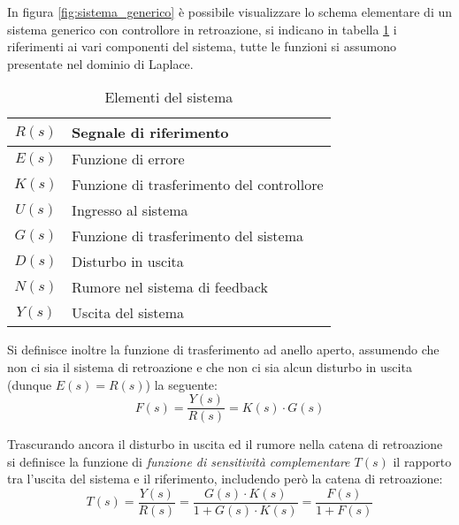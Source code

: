 In figura \ref{fig:sistema_generico} è possibile visualizzare lo schema elementare di un sistema generico con controllore in retroazione, si indicano in tabella \ref{tab:elementi_sistema} i riferimenti ai vari componenti del sistema, tutte le funzioni si assumono presentate nel dominio di Laplace.
\begin{table}[h]\centering
    \begin{tabular}{c | l}
        $R(s)$ & Segnale di riferimento                    \\ \hline
        $E(s)$ & Funzione di errore                        \\ \hline
        $K(s)$ & Funzione di trasferimento del controllore \\ \hline
        $U(s)$ & Ingresso al sistema                       \\ \hline
        $G(s)$ & Funzione di trasferimento del sistema     \\ \hline
        $D(s)$ & Disturbo in uscita                        \\ \hline
        $N(s)$ & Rumore nel sistema di feedback            \\ \hline
        $Y(s)$ & Uscita del sistema
    \end{tabular}
    \caption{Elementi del sistema}
    \label{tab:elementi_sistema}
\end{table}

Si definisce inoltre la funzione di trasferimento ad anello aperto, assumendo che non ci sia il sistema di retroazione e che non ci sia alcun disturbo in uscita (dunque $E(s) = R(s)$) la seguente:
$$
    F(s) = \frac{Y(s)}{R(s)} = K(s)\cdot G(s)
$$

Trascurando ancora il disturbo in uscita ed il rumore nella catena di retroazione si definisce la funzione di \textit{funzione di sensitività complementare $T(s)$} il rapporto tra l'uscita del sistema e il riferimento, includendo però la catena di retroazione:
$$
    T(s) = \frac{Y(s)}{R(s)} = \frac{G(s)\cdot K(s)}{1 + G(s)\cdot K(s)} =\frac{F(s)}{1+F(s)}
$$


